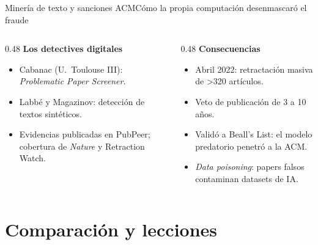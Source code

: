 \documentclass[11pt,aspectratio=169,xcolor=table]{beamer}
\begin{document}
\begin{frame}{Minería de texto y sanciones ACM}{Cómo la propia computación desenmascaró el fraude}
  \begin{columns}[T,onlytextwidth]
    \begin{column}{0.48\textwidth}
      \textbf{Los detectives digitales}
      \begin{itemize}
        \item Cabanac (U.~Toulouse III): \emph{Problematic Paper Screener}.
        \item Labbé y Magazinov: detección de textos sintéticos.
        \item Evidencias publicadas en PubPeer; cobertura de \emph{Nature} y
          Retraction Watch.
      \end{itemize}
    \end{column}
    \begin{column}{0.48\textwidth}
      \textbf{Consecuencias}
      \begin{itemize}
        \item Abril 2022: retractación masiva de \alert{>320 artículos}.
        \item Veto de publicación de 3 a 10 años.
        \item Validó a Beall's List: el modelo predatorio penetró a la ACM.
        \item \emph{Data poisoning}: papers falsos contaminan datasets de IA.
      \end{itemize}
    \end{column}
  \end{columns}
\end{frame}

\section{Comparación y lecciones}
\end{document}
